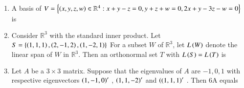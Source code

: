 \documentclass[journal]{IEEEtran}
\begin{document}
\begin{enumerate}
\begin{enumerate}
\end{enumerate}
\item A basis of $V = \left\{\left(x, y, z, w\right) \in \mathbb{R}^4: x+y-z=0, y+z+w=0, 2x+y-3z-w=0\right\}$ is
\begin{enumerate}
\end{enumerate}
\item Consider $\mathbb{R}^{3}$ with the standard inner product. Let $ S=\left\{\left(1,1,1\right), \left(2,-1,2\right), \left(1,-2,1\right)\right\}$ For a subset $W$ of $\mathbb{R}^{3}$, let $L\left(W\right)$ denote the linear span of $W$ in $\mathbb{R}^{3}$. Then an orthonormal set $T$ with $L\left(S\right)=L\left(T\right)$ is  
\begin{enumerate}
\end{enumerate}
\item Let $A$ be a $3\times3$ matrix. Suppose that the eigenvalues of $A$ are $-1, 0, 1$ with respective eigenvectors $\left(1, -1, 0\right)^{\prime}$ , $\left(1, 1, -2\right)^{\prime}$ and $\left((1, 1, 1\right)^{\prime}$ . Then 6A equals
\begin{enumerate}
\end{enumerate}
\end{enumerate}
\end{document}

